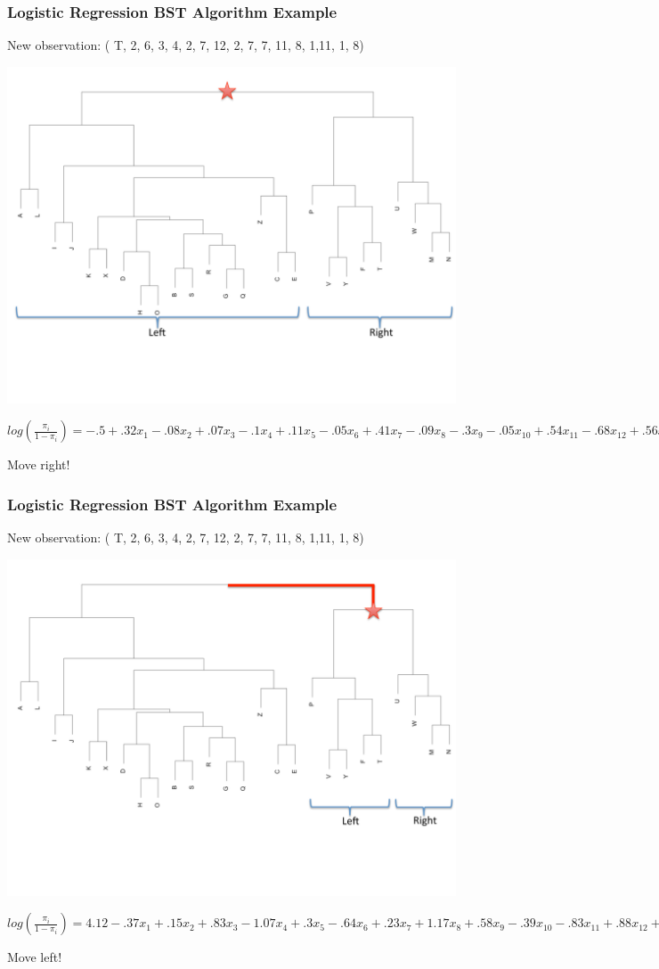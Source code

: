 \documentclass{beamer}
\begin{document}
\begin{frame}
\frametitle{\small{Logistic Regression BST Algorithm Example}}
\small{New observation: ( T, 2,     6,     3,    4,     2,     7,    12,      2,      7,      7,      11,       8,     1,11,     1,      8)}
\begin{center} 
\includegraphics[width=.7 \textwidth]{firstStep}

\tiny{$log(\frac{\pi_i}{1-\pi_i})= -.5+.32x_1-.08x_2+.07x_3-.1x_4+.11x_5-.05x_6+.41x_7-.09x_8-.3x_{9}-.05x_{10}+.54x_{11}-.68x_{12}+.56x_{13}+.23x_{14}-.58x_{15}-.24x_{16} \rightarrow \hat{\pi}=0.929$}
\end{center}
Move right!

\end{frame}

\begin{frame}
\frametitle{\small{Logistic Regression BST Algorithm Example}}
\small{New observation: ( T, 2,     6,     3,    4,     2,     7,    12,      2,      7,      7,      11,       8,     1,11,     1,      8)}
\begin{center} 
\includegraphics[width=.7 \textwidth]{secondStep}

\tiny{$log(\frac{\pi_i}{1-\pi_i})= 4.12-.37x_1+.15x_2+.83x_3-1.07x_4+.3x_5-.64x_6+.23x_7+1.17x_8+.58x_{9}-.39x_{10}-.83x_{11}+.88x_{12}+1.87x_{13}-.51x_{14}-2x_{15}-.57x_{16} \rightarrow \hat{\pi}=0.0007$}
\end{center}
Move left!

\end{frame}
\end{document}
